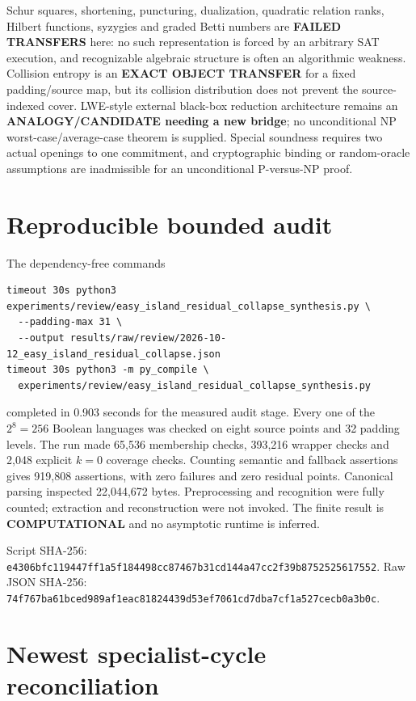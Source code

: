 \documentclass[11pt]{article}
\newcommand{\COMP}{\textbf{COMPUTATIONAL}}
\begin{document}
Schur squares, shortening, puncturing, dualization, quadratic relation ranks,
Hilbert functions, syzygies and graded Betti numbers are
\textbf{FAILED TRANSFERS} here: no such representation is forced by an
arbitrary SAT execution, and recognizable algebraic structure is often an
algorithmic weakness.  Collision entropy is an \textbf{EXACT OBJECT
TRANSFER} for a fixed padding/source map, but its collision distribution does
not prevent the source-indexed cover.  LWE-style external black-box reduction
architecture remains an \textbf{ANALOGY/CANDIDATE needing a new bridge}; no
unconditional NP worst-case/average-case theorem is supplied.  Special
soundness requires two actual openings to one commitment, and cryptographic
binding or random-oracle assumptions are inadmissible for an unconditional
P-versus-NP proof.

\section{Reproducible bounded audit}

The dependency-free commands
\begin{verbatim}
timeout 30s python3 experiments/review/easy_island_residual_collapse_synthesis.py \
  --padding-max 31 \
  --output results/raw/review/2026-10-12_easy_island_residual_collapse.json
timeout 30s python3 -m py_compile \
  experiments/review/easy_island_residual_collapse_synthesis.py
\end{verbatim}
completed in 0.903 seconds for the measured audit stage.  Every one of the
$2^8=256$ Boolean languages was checked on eight source points and 32 padding
levels.  The run made 65,536 membership checks, 393,216 wrapper checks and
2,048 explicit $k=0$ coverage checks.  Counting semantic and fallback
assertions gives 919,808 assertions, with zero failures and zero residual
points.  Canonical parsing inspected 22,044,672 bytes.  Preprocessing and
recognition were fully counted; extraction and reconstruction were not
invoked.  The finite result is \COMP{} and no asymptotic runtime is inferred.

Script SHA-256:
\nolinkurl{e4306bfc119447ff1a5f184498cc87467b31cd144a47cc2f39b8752525617552}.
Raw JSON SHA-256:
\nolinkurl{74f767ba61bced989af1eac81824439d53ef7061cd7dba7cf1a527cecb0a3b0c}.

\section{Newest specialist-cycle reconciliation}
\end{document}
